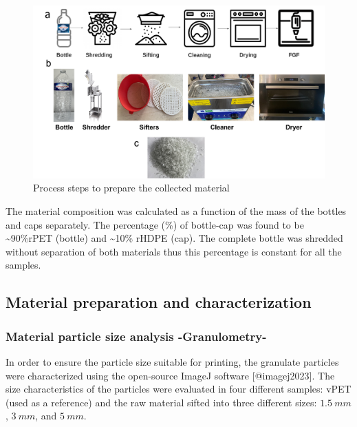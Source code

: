 \documentclass[
  letterpaper,
  DIV=11,
  numbers=noendperiod]{scrartcl}
\begin{document}
\begin{figure}

{\centering \includegraphics{figures/Fig_2.png}

}

\caption{\label{fig-fig1}Process steps to prepare the collected
material}

\end{figure}

The material composition was calculated as a function of the mass of the
bottles and caps separately. The percentage (\%) of bottle-cap was found
to be \textasciitilde90\%rPET (bottle) and \textasciitilde10\% rHDPE
(cap). The complete bottle was shredded without separation of both
materials thus this percentage is constant for all the samples.

\hypertarget{material-preparation-and-characterization}{%
\subsection{Material preparation and
characterization}\label{material-preparation-and-characterization}}

\hypertarget{material-particle-size-analysis--granulometry-}{%
\subsubsection{Material particle size analysis
-Granulometry-}\label{material-particle-size-analysis--granulometry-}}

In order to ensure the particle size suitable for printing, the
granulate particles were characterized using the open-source ImageJ
software {[}@imagej2023{]}. The size characteristics of the particles
were evaluated in four different samples: vPET (used as a reference) and
the raw material sifted into three different sizes: \(1.5~mm\),
\(3~mm\), and \(5~mm\).
\end{document}
